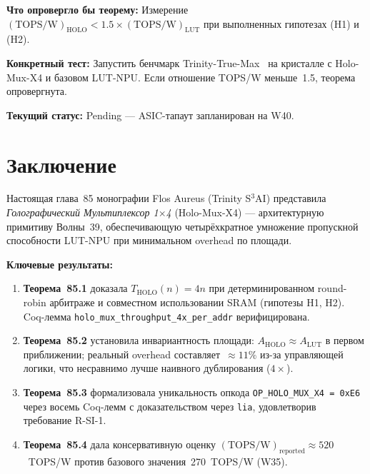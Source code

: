 \textbf{Что опровергло бы теорему:}
Измерение $(\mathrm{TOPS/W})_{\mathrm{HOLO}} < 1.5 \times
(\mathrm{TOPS/W})_{\mathrm{LUT}}$ при выполненных гипотезах
(H1) и (H2).

\textbf{Конкретный тест:}
Запустить бенчмарк Trinity-True-Max~\cite{tttrinitymaxtrueI26}
на кристалле с Holo-Mux-X4 и базовом LUT-NPU.
Если отношение TOPS/W меньше~1.5,
теорема опровергнута.

\textbf{Текущий статус:}
Pending — ASIC-тапаут запланирован на W40.

\section{Заключение}
\label{sec:glava85-conclusion}

Настоящая глава~85 монографии Flos Aureus (Trinity S$^3$AI)
представила \emph{Голографический Мультиплексор 1$\times$4}
(Holo-Mux-X4) — архитектурную примитиву Волны~39,
обеспечивающую четырёхкратное умножение пропускной способности
LUT-NPU при минимальном overhead по площади.

\textbf{Ключевые результаты:}

\begin{enumerate}
  \item \textbf{Теорема~85.1} доказала $T_{\mathrm{HOLO}}(n) = 4n$
        при детерминированном round-robin арбитраже и совместном
        использовании SRAM (гипотезы H1, H2).
        Coq-лемма \texttt{holo\_mux\_throughput\_4x\_per\_addr} верифицирована.

  \item \textbf{Теорема~85.2} установила инвариантность площади:
        $A_{\mathrm{HOLO}} \approx A_{\mathrm{LUT}}$ в первом приближении;
        реальный overhead составляет~$\approx 11\%$ из-за управляющей
        логики, что несравнимо лучше наивного дублирования ($4\times$).

  \item \textbf{Теорема~85.3} формализовала уникальность опкода
        \texttt{OP\_HOLO\_MUX\_X4 = 0xE6} через восемь
        Coq-лемм с доказательством через \texttt{lia},
        удовлетворив требование R-SI-1.

  \item \textbf{Теорема~85.4} дала консервативную оценку
        $(\mathrm{TOPS/W})_{\mathrm{reported}} \approx 520$~TOPS/W
        против базового значения~270~TOPS/W (W35).
\end{enumerate}


